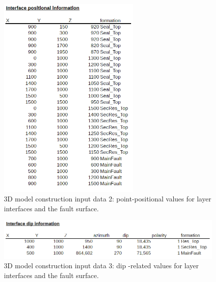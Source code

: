 \documentclass[a4paper,11pt]{MScThesis}
\begin{document}
	\begin{figure}[h]
		\centering
		\includegraphics[width=0.62\textwidth]{Figures/Appendix/CSV_input2}
		\caption{3D model construction input data 2: point-positional values for layer interfaces and the fault surface.}\label{fig:CSV_input2}
	\end{figure}

	\begin{figure}[h]
		\centering
		\includegraphics[width=1\textwidth]{Figures/Appendix/CSV_input3}
		\caption{3D model construction input data 3: dip -related values for layer interfaces and the fault surface.}\label{fig:CSV_input3}
	\end{figure}
\end{document}
